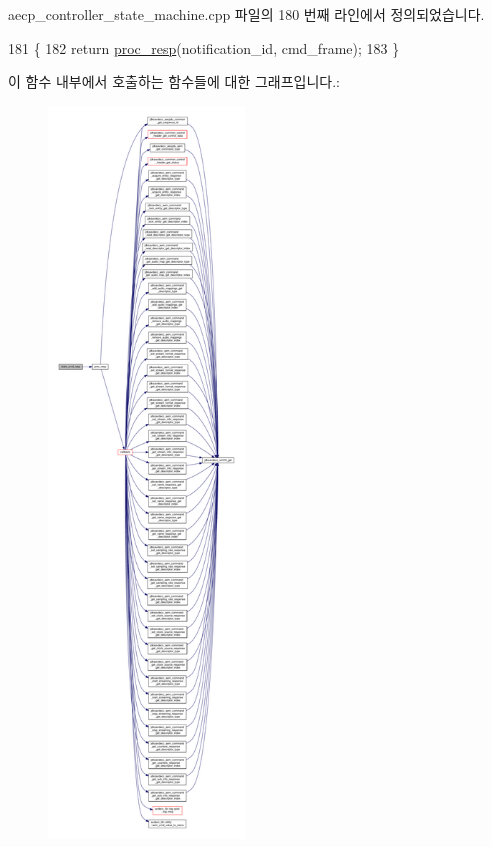 aecp\+\_\+controller\+\_\+state\+\_\+machine.\+cpp 파일의 180 번째 라인에서 정의되었습니다.


\begin{DoxyCode}
181 \{
182     \textcolor{keywordflow}{return} \hyperlink{classavdecc__lib_1_1aecp__controller__state__machine_a81d345252361d6b1650316379916ccf6}{proc\_resp}(notification\_id, cmd\_frame);
183 \}
\end{DoxyCode}


이 함수 내부에서 호출하는 함수들에 대한 그래프입니다.\+:
\nopagebreak
\begin{figure}[H]
\begin{center}
\leavevmode
\includegraphics[height=550pt]{classavdecc__lib_1_1aecp__controller__state__machine_a9a29a329925ab62cdef9e98b2520bed8_cgraph}
\end{center}
\end{figure}




